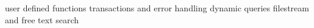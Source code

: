 \documentclass{article}
\begin{document}
    user defined functions
    transactions and error handling
    dynamic queries
    filestream and free text search
\end{document}
